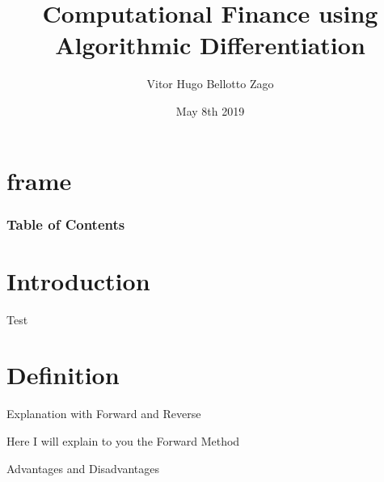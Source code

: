 \documentclass[t]{beamer}
\newcommand{\dcocpp}{{\ttfamily dco\kern-.08em{\raisebox{-.1ex}{/}\kern-.15em {c\kern-.03em{\raisebox{-.18ex}{+\kern-.028em{+}}}}}}}
\begin{document}

\title{Computational Finance using Algorithmic Differentiation}
\date{May 8th 2019}
\author{Vitor Hugo Bellotto Zago}

\frame{\titlepage}

\lstset{language=C++}
\lstset{basicstyle=\small}
\lstset{numbers=none}
\lstset{numberstyle=\scriptsize}
\lstset{numbersep=5pt}

\section{frame}

\begin{frame}
\frametitle{Table of Contents}
\tableofcontents[currentsection]
\end{frame}



\section{Introduction}
\begin{frame} Test \end{frame}

\section{Definition}
\begin{frame} Explanation with Forward and Reverse\end{frame}

  \begin{frame} Here I will explain to you the Forward Method \end{frame} 

\begin{frame} Advantages and Disadvantages \end{frame}
\end{document}
